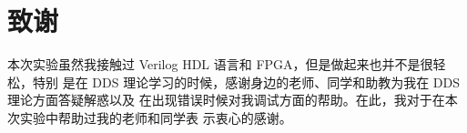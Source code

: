 \chapter*{致\quad 谢}

\songti\xiaosi
\begin{spacing}{1.5}

本次实验虽然我接触过 Verilog HDL 语言和 FPGA，但是做起来也并不是很轻松，特别 是在 DDS 理论学习的时候，感谢身边的老师、同学和助教为我在 DDS 理论方面答疑解惑以及 在出现错误时候对我调试方面的帮助。在此，我对于在本次实验中帮助过我的老师和同学表 示衷心的感谢。


\end{spacing}